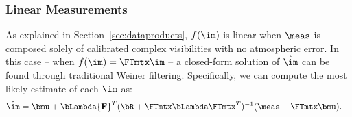 

\vspace{0.1in}
\subsubsection{Linear Measurements}


As explained in Section~\ref{sec:dataproducts}, $f(\im)$ is linear when $\meas$ is composed solely of calibrated complex visibilities with no %
atmospheric error.
In this case -- when $f(\im) = \FTmtx \im$ --
a closed-form solution of $\hat{\im}$ can be found %
through traditional Weiner filtering. Specifically, we can compute the most likely estimate of each $\im$ as: 
\begin{align}
\hat{\im} &=  \bmu  + \bLambda {\bf F}^T ( \bR + \FTmtx \bLambda \FTmtx^{T} )^{-1} (  \meas -  \FTmtx \bmu ) .
\label{eq:map}
\end{align}
